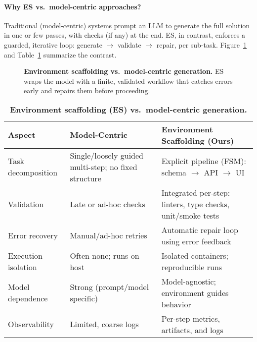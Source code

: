 \documentclass{article}
\begin{document}
\paragraph{Why ES vs.\ model-centric approaches?}
Traditional (model-centric) systems prompt an LLM to generate the full solution in one or few passes, with checks (if any) at the end. ES, in contrast, enforces a guarded, iterative loop: generate $\rightarrow$ validate $\rightarrow$ repair, per sub-task. Figure~\ref{fig:es-vs-model} and Table~\ref{tab:es-contrast} summarize the contrast.

\begin{figure}[t]
  \centering
  
  \vspace{-0.5em}
  \caption{\textbf{Environment scaffolding vs.\ model-centric generation.} ES wraps the model with a finite, validated workflow that catches errors early and repairs them before proceeding.}
  \label{fig:es-vs-model}
\end{figure}

\begin{table}[t]
\centering
\small
\begin{threeparttable}
\caption{\textbf{Environment scaffolding (ES) vs.\ model-centric generation.}}
\label{tab:es-contrast}
\begin{tabular}{@{}p{3.2cm}p{5.6cm}p{5.6cm}@{}}
\toprule
\textbf{Aspect} & \textbf{Model-Centric} & \textbf{Environment Scaffolding (Ours)} \\
\midrule
Task decomposition & Single/loosely guided multi-step; no fixed structure &
Explicit pipeline (FSM): schema $\rightarrow$ API $\rightarrow$ UI \\
Validation & Late or ad-hoc checks &
Integrated per-step: linters, type checks, unit/smoke tests \\
Error recovery & Manual/ad-hoc retries &
Automatic repair loop using error feedback \\
Execution isolation & Often none; runs on host &
Isolated containers; reproducible runs \\
Model dependence & Strong (prompt/model specific) &
Model-agnostic; environment guides behavior \\
Observability & Limited, coarse logs &
Per-step metrics, artifacts, and logs \\
\bottomrule
\end{tabular}
\end{threeparttable}
\end{table}
\end{document}
